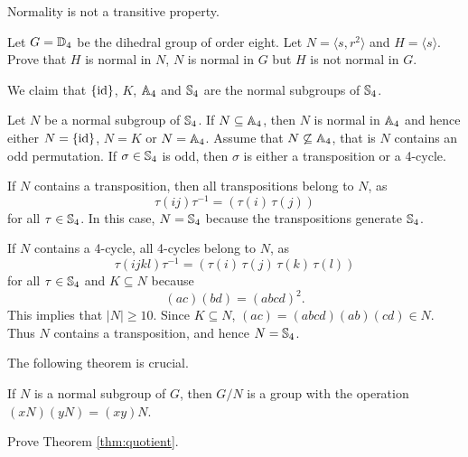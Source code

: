 Normality is not a transitive property. 

\begin{exercise}
\label{xca:D4_normal}
Let $G=\mathbb{D}_4$ be the dihedral group of order eight. Let $N=\langle s,r^2\rangle$ and $H=\langle s\rangle$.
Prove that $H$ is normal in $N$, $N$ is normal in $G$ but $H$ is not normal in $G$. 
\end{exercise}



\begin{example}
We claim that $\{\operatorname{id}\}$, $K$, $\mathbb{A}_4$ and $\mathbb{S}_4$ are the normal subgroups of $\mathbb{S}_4$.

Let $N$ be a normal subgroup of $\mathbb{S}_4$. If $N\subseteq\mathbb{A}_4$, then
$N$ is normal in $\mathbb{A}_4$ and hence either $N=\{\operatorname{id}\}$,
$N=K$ or $N=\mathbb{A}_4$. Assume that $N\not\subseteq\mathbb{A}_4$, that is
$N$ contains an odd permutation. If $\sigma\in\mathbb{S}_4$ is odd, then 
$\sigma$ is either a transposition or a 4-cycle. 
 
If $N$ contains a transposition, then all transpositions 
belong to $N$, as 
\[
\tau(ij)\tau^{-1}=(\tau(i)\,\tau(j))
\]
for all $\tau\in\mathbb{S}_4$. In this case, $N=\mathbb{S}_4$ because 
the transpositions generate $\mathbb{S}_4$. 


If $N$ contains a 4-cycle, all 4-cycles belong to $N$, as 
\[
\tau(ijkl)\tau^{-1}=(\tau(i)\,\tau(j)\,\tau(k)\,\tau(l))
\]
for all $\tau\in\mathbb{S}_4$ and $K\subseteq N$ because 
\[
(ac)(bd)=(abcd)^2.
\]
This implies that $|N|\geq10$. Since $K\subseteq N$, 
$(ac)=(abcd)(ab)(cd)\in N$. Thus $N$ contains a transposition, and hence $N=\mathbb{S}_4$. 
\end{example}

The following theorem is crucial.

\begin{theorem}
\label{thm:quotient}
If $N$ is a normal subgroup of $G$, then
$G/N$ is a group with the operation 
$(xN)(yN)=(xy)N$.
\end{theorem}

\begin{exercise}
    Prove Theorem \ref{thm:quotient}.   
\end{exercise}


